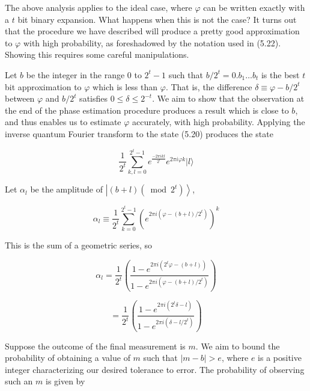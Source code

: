 The above analysis applies to the ideal case, where $\varphi$ can be written exactly with a $t$ bit binary expansion. What happens when this is not the case? It turns out that the procedure we have described will produce a pretty good approximation to $\varphi$ with high probability, as foreshadowed by the notation used in (5.22). Showing this requires some careful manipulations.

Let $b$ be the integer in the range 0 to $2^{t}-1$ such that $b / 2^{t}=0 . b_{1} \ldots b_{t}$ is the best $t$ bit approximation to $\varphi$ which is less than $\varphi$. That is, the difference $\delta \equiv \varphi-b / 2^{t}$ between $\varphi$ and $b / 2^{t}$ satisfies $0 \leq \delta \leq 2^{-t}$. We aim to show that the observation at the end of the phase estimation procedure produces a result which is close to $b$, and thus enables us to estimate $\varphi$ accurately, with high probability. Applying the inverse quantum Fourier transform to the state (5.20) produces the state

\begin{equation}
    \frac{1}{2^{t}} \sum_{k, l=0}^{2^{t}-1} e^{\frac{-2 \pi i k l}{2^{t}}} e^{2 \pi i \varphi k}|l\rangle \tag{5.23}
\end{equation}

Let $\alpha_{l}$ be the amplitude of $\left|(b+l)\left(\bmod 2^{t}\right)\right\rangle$,

\begin{equation}
    \alpha_{l} \equiv \frac{1}{2^{t}} \sum_{k=0}^{2^{t}-1}\left(e^{2 \pi i\left(\varphi-(b+l) / 2^{t}\right)}\right)^{k} \tag{5.24}
\end{equation}

This is the sum of a geometric series, so

\begin{equation}
    \alpha_{l}=\frac{1}{2^{t}}\left(\frac{1-e^{2 \pi i\left(2^{t} \varphi-(b+l)\right)}}{1-e^{2 \pi i\left(\varphi-(b+l) / 2^{t}\right)}}\right) \tag{5.25}
\end{equation}

\begin{equation}
    =\frac{1}{2^{t}}\left(\frac{1-e^{2 \pi i\left(2^{t} \delta-l\right)}}{1-e^{2 \pi i\left(\delta-l / 2^{t}\right)}}\right) \tag{5.26}
\end{equation}

Suppose the outcome of the final measurement is $m$. We aim to bound the probability of obtaining a value of $m$ such that $|m-b|>e$, where $e$ is a positive integer characterizing our desired tolerance to error. The probability of observing such an $m$ is given by

